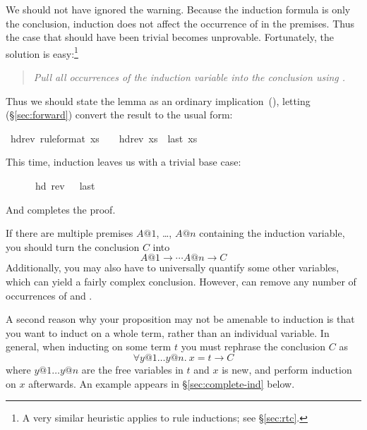 \begin{isabellebody}
\begin{isamarkuptxt}
We should not have ignored the warning. Because the induction
formula is only the conclusion, induction does not affect the occurrence of  in the premises.  
Thus the case that should have been trivial
becomes unprovable. Fortunately, the solution is easy:\footnote{A very similar
heuristic applies to rule inductions; see \S\ref{sec:rtc}.}
\begin{quote}
\emph{Pull all occurrences of the induction variable into the conclusion
using \isa{{\isasymlongrightarrow}}.}
\end{quote}
Thus we should state the lemma as an ordinary 
implication~(\isa{{\isasymlongrightarrow}}), letting
 (\S\ref{sec:forward}) convert the
result to the usual \isa{{\isasymLongrightarrow}} form:%
\end{isamarkuptxt}%
\ hd{\isacharunderscore}rev\ {\isacharbrackleft}rule{\isacharunderscore}format{\isacharbrackright}{\isacharcolon}\ {\isachardoublequote}xs\ {\isasymnoteq}\ {\isacharbrackleft}{\isacharbrackright}\ {\isasymlongrightarrow}\ hd{\isacharparenleft}rev\ xs{\isacharparenright}\ {\isacharequal}\ last\ xs{\isachardoublequote}%
\begin{isamarkuptxt}%
\noindent
This time, induction leaves us with a trivial base case:
\begin{isabelle}%
\ {}{\isachardot}\ {\isacharbrackleft}{\isacharbrackright}\ {\isasymnoteq}\ {\isacharbrackleft}{\isacharbrackright}\ {\isasymlongrightarrow}\ hd\ {\isacharparenleft}rev\ {\isacharbrackleft}{\isacharbrackright}{\isacharparenright}\ {\isacharequal}\ last\ {\isacharbrackleft}{\isacharbrackright}%
\end{isabelle}
And  completes the proof.

If there are multiple premises $A@1$, \dots, $A@n$ containing the
induction variable, you should turn the conclusion $C$ into
\[ A@1 \longrightarrow \cdots A@n \longrightarrow C \]
Additionally, you may also have to universally quantify some other variables,
which can yield a fairly complex conclusion.  However,  
can remove any number of occurrences of \isa{{\isasymforall}} and
\isa{{\isasymlongrightarrow}}.%
\end{isamarkuptxt}%
%
\begin{isamarkuptext}%
A second reason why your proposition may not be amenable to induction is that
you want to induct on a whole term, rather than an individual variable. In
general, when inducting on some term $t$ you must rephrase the conclusion $C$
as
\begin{equation}\label{eqn:ind-over-term}
\forall y@1 \dots y@n.~ x = t \longrightarrow C
\end{equation}
where $y@1 \dots y@n$ are the free variables in $t$ and $x$ is new, and
perform induction on $x$ afterwards. An example appears in
\S\ref{sec:complete-ind} below.


\end{isamarkuptext}
\end{isabellebody}
